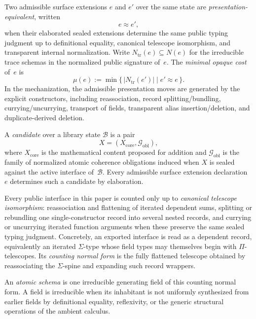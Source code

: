 \documentclass{lmcs}
\newcommand{\B}{\mathcal{B}}
\newcommand{\Gcal}{\mathcal{G}}
\begin{document}
\begin{defi}
\label{def:mu}
Two admissible surface extensions $e$ and $e'$ over the same state are \emph{presentation-equivalent}, written
\[
  e \approx e',
\]
when their elaborated sealed extensions determine the same public typing judgment up to definitional equality, canonical telescope isomorphism, and transparent internal normalization. Write $N_{\mathrm{tr}}(e) \subseteq N(e)$ for the irreducible trace schemas in the normalized public signature of~$e$. The \emph{minimal opaque cost} of~$e$ is
\[
  \mu(e) := \min \bigl\{\, |N_{\mathrm{tr}}(e')| \;\big|\; e' \approx e \,\bigr\}.
\]
In the mechanization, the admissible presentation moves are generated by the explicit  constructors, including reassociation, record splitting/bundling, currying/uncurrying, transport of fields, transparent alias insertion/deletion, and duplicate-derived deletion.
\end{defi}

\begin{defi}[Candidate]
\label{def:candidate}
A \emph{candidate} over a library state $\B$ is a pair
\[
  X = (X_{\mathrm{core}}, \Gcal_{\mathrm{obl}}),
\]
where $X_{\mathrm{core}}$ is the mathematical content proposed for addition and $\Gcal_{\mathrm{obl}}$ is the family of normalized atomic coherence obligations induced when $X$ is sealed against the active interface of~$\B$.
Every admissible surface extension declaration~$e$ determines such a candidate by elaboration.
\end{defi}

\begin{defi}
\label{def:atomic-schema}
Every public interface in this paper is counted only up to \emph{canonical telescope isomorphism}: reassociation and flattening of iterated dependent sums, splitting or rebundling one single-constructor record into several nested records, and currying or uncurrying iterated function arguments when these preserve the same sealed typing judgment. Concretely, an exported interface is read as a dependent record, equivalently an iterated $\Sigma$-type whose field types may themselves begin with $\Pi$-telescopes. Its \emph{counting normal form} is the fully flattened telescope obtained by reassociating the $\Sigma$-spine and expanding such record wrappers.

An \emph{atomic schema} is one irreducible generating field of this counting normal form. A field is irreducible when its inhabitant is not uniformly synthesized from earlier fields by definitional equality, reflexivity, or the generic structural operations of the ambient calculus.
\end{defi}
\end{document}
